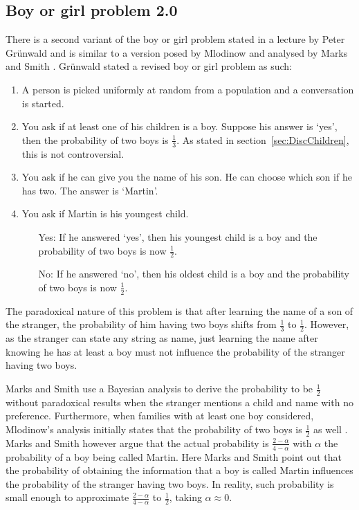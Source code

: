 \documentclass[a4paper]{report}
\theoremstyle{plain}
\theoremstyle{definition}
\theoremstyle{remark}
\numberwithin{equation}{chapter}
\DeclareMathOperator{\1}{\mathbbm{1}}
\begin{document}
\subsection{Boy or girl problem 2.0}\label{sec:DiscChild2}
There is a second variant of the boy or girl problem stated in a lecture by Peter Grünwald \cite{Grunwald19} and is similar to a version posed by Mlodinow \cite{Mlodinow09} and analysed by Marks and Smith \cite{Marks11}. Grünwald stated a revised boy or girl problem as such:
\begin{enumerate}
    \item A person is picked uniformly at random from a population and a conversation is started.
    \item You ask if at least one of his children is a boy. Suppose his answer is `yes', then the probability of two boys is $\frac{1}{3}$. As stated in section~\ref{sec:DiscChildren}, this is not controversial.
    \item You ask if he can give you the name of his son. He can choose which son if he has two. The answer is `Martin'.
    \item You ask if Martin is his youngest child.
    \begin{itemize}
        \item[Yes:] If he answered `yes', then his youngest child is a boy and the probability of two boys is now $\frac{1}{2}$.
        \item[No:] If he answered `no', then his oldest child is a boy and the probability of two boys is now $\frac{1}{2}$.
    \end{itemize}
\end{enumerate}

The paradoxical nature of this problem is that after learning the name of a son of the stranger, the probability of him having two boys shifts from $\frac{1}{3}$ to $\frac{1}{2}$. However, as the stranger can state any string as name, just learning the name after knowing he has at least a boy must not influence the probability of the stranger having two boys.

Marks and Smith \cite{Marks11} use a Bayesian analysis to derive the probability to be $\frac{1}{2}$ without paradoxical results when the stranger mentions a child and name with no preference. Furthermore, when families with at least one boy considered, Mlodinow's analysis initially states that the probability of two boys is $\frac{1}{2}$ as well \cite{Marks11,Mlodinow09}. Marks and Smith however argue that the actual probability is $\frac{2-\alpha}{4-\alpha}$ with $\alpha$ the probability of a boy being called Martin. Here Marks and Smith point out that the probability of obtaining the information that a boy is called Martin influences the probability of the stranger having two boys. In reality, such probability is small enough to approximate $\frac{2-\alpha}{4-\alpha}$ to $\frac{1}{2}$, taking $\alpha\approx0$.
\end{document}
